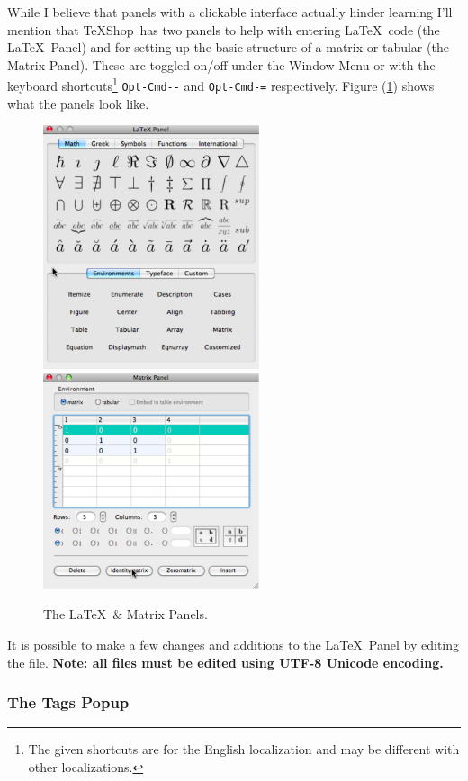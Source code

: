 \documentclass[letterpaper,11pt]{article}
\newcommand{\TS}{\textsf{\TeX Shop}}
\newcommand{\mnu}[1]{\textsf{#1}}
\begin{document}
While I believe that panels with a clickable interface actually hinder learning I'll mention that \TS\ has two panels to help with entering \LaTeX\ code (the \LaTeX\ Panel) and for setting up the basic structure of a matrix or tabular (the Matrix Panel). These are toggled on/off under the \mnu{Window} Menu or with the keyboard shortcuts\footnote{The given shortcuts are for the English localization and may be different with other localizations.} \texttt{Opt-Cmd-{}-} and \texttt{Opt-Cmd-=} respectively. Figure (\ref{fig:LandMPanels}) shows what the panels look like.
\begin{figure}
\includegraphics[width=2.5in]{figs/LaTeXPanel}\hfill\includegraphics[width=2.5in]
{figs/MatrixPanel}
\caption{The \LaTeX\ \& Matrix Panels.}
\label{fig:LandMPanels}
\end{figure}
It is possible to make a few changes and additions to the \LaTeX\ Panel by editing the 
 file. \textbf{Note: all  files must be edited using UTF-8 Unicode encoding.}

\subsubsection{The Tags Popup}
\end{document}

